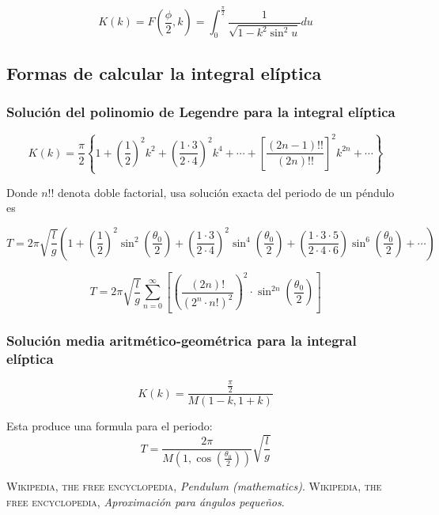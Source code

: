 \documentclass[12pt]{article}
\begin{document}
\begin{equation}
K(k)=F\left(\frac{\phi}{2},k\right)= \int_0^{\frac{\pi}{2}} \frac{1}{\sqrt{1-k^2 \sin^2 u}}du
\end{equation}

\subsection{Formas de calcular la integral elíptica}

\subsubsection{Solución del polinomio de Legendre para la integral elíptica  }

\begin{equation*}
K(k)=\frac{\pi}{2} \left \{ 1 + \left(\frac{1}{2}\right)^2 k^2 + \left(\frac{1 \cdotp 3}{2 \cdotp 4}\right)^2 k^4 + \cdots +\left[\frac{(2n-1)!!}{(2n)!!}\right]^2 k^{2n}+ \cdots \right \}
\end{equation*}

Donde $n!!$ denota doble factorial, usa solución exacta del periodo de un péndulo es

\begin{equation*}
T= 2\pi \sqrt{\frac{l}{g}}\left ( 1 + \left(\frac{1}{2}\right)^2 \sin^2 \left(\frac{\theta_0}{2}\right) + \left(\frac{1 \cdotp 3}{2 \cdotp 4}\right)^2 \sin^4\left(\frac{\theta_0}{2}\right) + \left(\frac{1 \cdotp 3 \cdotp 5 }{2 \cdotp 4 \cdotp 6}\right) \sin^6\left(\frac{\theta_0}{2}\right) + \cdots \right)
\end{equation*}

\begin{equation*}
T=2\pi \sqrt{\frac{l}{g}} \sum_{n=0}^\infty \left[\left(\frac{(2n)!}{(2^n \cdotp n!)^2}\right)^2 \cdotp \sin^{2n} \left(\frac{\theta_0}{2}\right)\right] 
\end{equation*}

\subsubsection{Solución media aritmético-geométrica para la integral elíptica}

\begin{equation*}
K(k)= \frac{\frac{\pi}{2}}{M(1-k,1+k)}
\end{equation*}

Esta produce una formula para el periodo:\\

\begin{equation*}
T=\frac{2\pi}{M\left(1,\cos\left(\frac{\theta_0}{2} \right)\right)}\sqrt{\frac{l}{g}}
\end{equation*}


\pagebreak

\begin{thebibliography}{X}
 \textsc{Wikipedia, the free encyclopedia},
\textit{Pendulum (mathematics)}.
 \textsc{Wikipedia, the free encyclopedia},
\textit{Aproximación para ángulos pequeños}.
\end{thebibliography}
\end{document}
